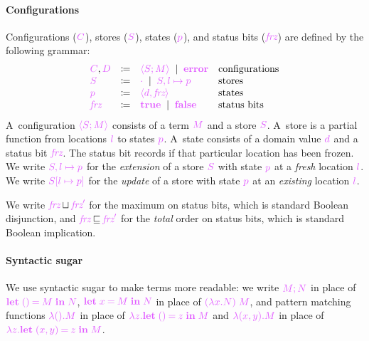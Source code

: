 \documentclass[main.tex]{subfiles}
\begin{document}
\paragraph*{Configurations}
Configurations ($\tm{C}$), stores ($\tm{S}$), states ($\tm{p}$), and status bits ($\tm{\frz}$) are defined by the following grammar:
\[
\begin{array}{lrll}
  \tm{C}, \tm{D}
  & \coloneqq & \tm{\config{M}{S}}
    \sep        \tm{\error}             & \text{configurations}
  \\
  \tm{S}
  & \coloneqq & \tm{\storeemp}
    \sep        \tm{\storeext{S}{l}{p}} & \text{stores}
  \\
  \tm{p}
  & \coloneqq & \tm{\st{d}{\frz}}       & \text{states}
  \\
  \tm{\frz}
  & \coloneqq & \tm{\true}
    \sep        \tm{\false}             & \text{status bits}
  \end{array}
\]
A~configuration $\tm{\config{M}{S}}$ consists of a term $\tm{M}$ and a store $\tm{S}$. A~store is a partial function from locations $\tm{l}$ to states $\tm{p}$. A~state consists of a domain value $\tm{d}$ and a status bit $\tm{\frz}$. The status bit records if that particular location has been frozen. We write $\tm{\storeext{S}{l}{p}}$ for the \emph{extension} of a store $\tm{S}$ with state $\tm{p}$ at a \emph{fresh} location $\tm{l}$. We write $\tm{\storeupd{S}{l}{p}}$ for the \emph{update} of a store with state $\tm{p}$ at an \emph{existing} location $\tm{l}$.

We write $\tm{\frz}\sqcupB\tm{\frz'}$ for the maximum on status bits, which is standard Boolean disjunction, and $\tm{\frz}\sqsubseteqB\tm{\frz'}$ for the \emph{total} order on status bits, which is standard Boolean implication.

\paragraph*{Syntactic sugar}
We use syntactic sugar to make terms more readable: we write $\tm{\andthen{M}{N}}$ in place of $\tm{\letunit{M}{N}}$, $\tm{\letbind{x}{M}{N}}$ in place of $\tm{(\lambda x.N)\;M}$, and pattern matching functions $\tm{\lambda\unit.M}$ in place of $\tm{\lambda z.\letunit{z}{M}}$ and $\tm{\lambda\pair{x}{y}.M}$ in place of $\tm{\lambda z.\letpair{x}{y}{z}{M}}$.
\end{document}
